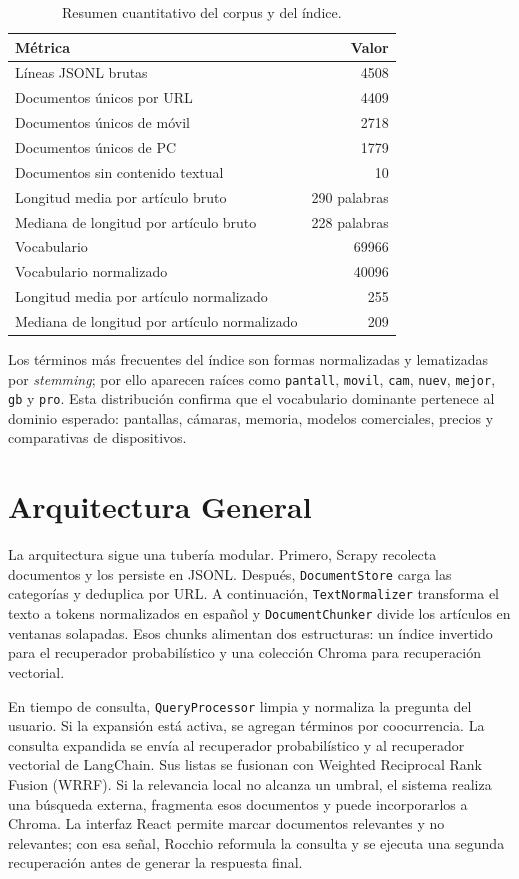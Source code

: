\documentclass[a4paper]{llncs}
\begin{document}
\begin{table}
\caption{Resumen cuantitativo del corpus y del índice.}
\label{tab:corpus}
\centering
\begin{tabular}{lr}
\toprule
Métrica & Valor \\
\midrule
Líneas JSONL brutas & 4508 \\
Documentos únicos por URL & 4409 \\
Documentos únicos de móvil & 2718 \\
Documentos únicos de PC & 1779 \\
Documentos sin contenido textual & 10 \\
Longitud media por artículo bruto & 290 palabras \\
Mediana de longitud por artículo bruto & 228 palabras \\
Vocabulario & 69966 \\
Vocabulario normalizado & 40096 \\
Longitud media por artículo normalizado & 255 \\
Mediana de longitud por artículo normalizado & 209 \\
\bottomrule
\end{tabular}
\end{table}

Los términos más frecuentes del índice son formas normalizadas y lematizadas por \textit{stemming}; por ello aparecen raíces como \texttt{pantall}, \texttt{movil}, \texttt{cam}, \texttt{nuev}, \texttt{mejor}, \texttt{gb} y \texttt{pro}. Esta distribución confirma que el vocabulario dominante pertenece al dominio esperado: pantallas, cámaras, memoria, modelos comerciales, precios y comparativas de dispositivos.

\section{Arquitectura General}

La arquitectura sigue una tubería modular. Primero, Scrapy recolecta documentos y los persiste en JSONL. Después, \texttt{DocumentStore} carga las categorías y deduplica por URL. A continuación, \texttt{TextNormalizer} transforma el texto a tokens normalizados en español y \texttt{DocumentChunker} divide los artículos en ventanas solapadas. Esos chunks alimentan dos estructuras: un índice invertido para el recuperador probabilístico y una colección Chroma para recuperación vectorial.

En tiempo de consulta, \texttt{QueryProcessor} limpia y normaliza la pregunta del usuario. Si la expansión está activa, se agregan términos por coocurrencia. La consulta expandida se envía al recuperador probabilístico y al recuperador vectorial de LangChain. Sus listas se fusionan con Weighted Reciprocal Rank Fusion (WRRF). Si la relevancia local no alcanza un umbral, el sistema realiza una búsqueda externa, fragmenta esos documentos y puede incorporarlos a Chroma. La interfaz React permite marcar documentos relevantes y no relevantes; con esa señal, Rocchio reformula la consulta y se ejecuta una segunda recuperación antes de generar la respuesta final.
\end{document}
